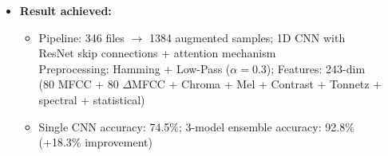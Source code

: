 \documentclass[aspectratio=169]{beamer}
\begin{document}
{\begin{frame}[t]
\begin{itemize}
  \vspace{0.15cm}

  \item \textbf{Result achieved:}
    \begin{itemize}\itemsep1pt
      \item Pipeline: 346 files $\to$ 1384 augmented samples; 1D CNN with\\
            ResNet skip connections + attention mechanism\\[2pt]
            {\tiny Preprocessing: Hamming + Low-Pass ($\alpha\!=\!0.3$);\; Features: 243-dim\\
             (80 MFCC + 80 $\Delta$MFCC + Chroma + Mel + Contrast + Tonnetz + spectral + statistical)}

      \item Single CNN accuracy: 74.5\%; 3-model ensemble accuracy: 92.8\%\\
            (+18.3\% improvement)
    \end{itemize}
\end{itemize}
\end{frame}
}
\end{document}
